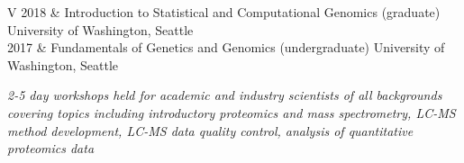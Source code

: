 \documentclass[11pt]{article}
\begin{document}
{}

\begin{longtable}{V}
    2018 & Introduction to Statistical and Computational Genomics (graduate)
         \newline University of Washington, Seattle \\
    2017 & Fundamentals of Genetics and Genomics (undergraduate)
         \newline University of Washington, Seattle  \\
\end{longtable}


\textit{2-5 day workshops held for academic and industry scientists of all backgrounds covering topics including introductory proteomics and mass spectrometry, LC-MS method development, LC-MS data quality control, analysis of quantitative proteomics data} 
\newline \\
\end{document}
